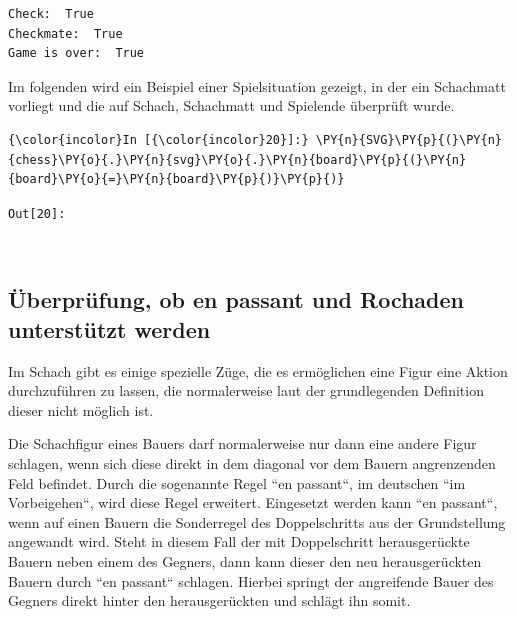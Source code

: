     \begin{Verbatim}[commandchars=\\\{\}]
Check:  True
Checkmate:  True
Game is over:  True

    \end{Verbatim}

    Im folgenden wird ein Beispiel einer Spielsituation gezeigt, in der ein
Schachmatt vorliegt und die auf Schach, Schachmatt und Spielende
überprüft wurde.

    \begin{Verbatim}[commandchars=\\\{\}]
{\color{incolor}In [{\color{incolor}20}]:} \PY{n}{SVG}\PY{p}{(}\PY{n}{chess}\PY{o}{.}\PY{n}{svg}\PY{o}{.}\PY{n}{board}\PY{p}{(}\PY{n}{board}\PY{o}{=}\PY{n}{board}\PY{p}{)}\PY{p}{)}
\end{Verbatim}

\texttt{\color{outcolor}Out[{\color{outcolor}20}]:}
    
    \begin{center}
    \end{center}
    { \hspace*{\fill} \\}
    

    \subsection{Überprüfung, ob en passant und Rochaden unterstützt
werden}\label{uxfcberpruxfcfung-ob-en-passant-und-rochaden-unterstuxfctzt-werden}

Im Schach gibt es einige spezielle Züge, die es ermöglichen eine Figur
eine Aktion durchzuführen zu lassen, die normalerweise laut der
grundlegenden Definition dieser nicht möglich ist.

Die Schachfigur eines Bauers darf normalerweise nur dann eine andere
Figur schlagen, wenn sich diese direkt in dem diagonal vor dem Bauern
angrenzenden Feld befindet. Durch die sogenannte Regel ``en passant``, im
deutschen ``im Vorbeigehen``, wird diese Regel erweitert. Eingesetzt
werden kann ``en passant``, wenn auf einen Bauern die Sonderregel des
Doppelschritts aus der Grundstellung angewandt wird. Steht in diesem
Fall der mit Doppelschritt herausgerückte Bauern neben einem des
Gegners, dann kann dieser den neu herausgerückten Bauern durch ``en
passant`` schlagen. Hierbei springt der angreifende Bauer des Gegners
direkt hinter den herausgerückten und schlägt ihn somit.


